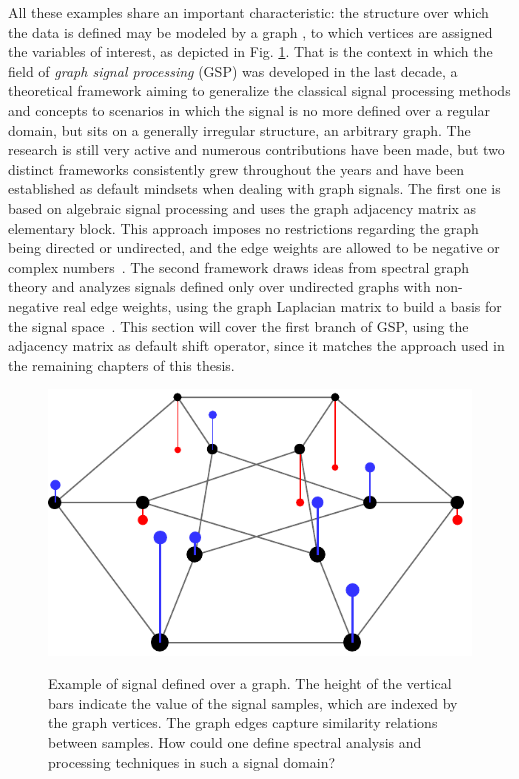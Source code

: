 All these examples share an important characteristic: the structure over which the data is defined may be modeled by a graph \cite{mei2016signal}, to which vertices are assigned the variables of interest, as depicted in Fig. \ref{fig:duher}. That is the context in which the field of \emph{graph signal processing} (GSP) was developed in the last decade, a theoretical framework aiming to generalize the classical signal processing methods and concepts to scenarios in which the signal is no more defined over a regular domain, but sits on a generally irregular structure, an arbitrary graph. The research is still very active and numerous contributions have been made, but two distinct frameworks consistently grew throughout the years and have been established as default mindsets when dealing with graph signals. The first one is based on algebraic signal processing and uses the graph adjacency matrix as elementary block. This approach imposes no restrictions regarding the graph being directed or undirected, and the edge weights are allowed to be negative or complex numbers~\cite{sandryhaila2014big}. The second framework draws ideas from spectral graph theory and analyzes signals defined only over undirected graphs with non-negative real edge weights, using the graph Laplacian matrix to build a basis for the signal space~\cite{shuman2013emerging}. This section will cover the first branch of GSP, using the adjacency matrix as default shift operator, since it matches the approach used in the remaining chapters of this thesis.

\begin{figure}
	\centering
    \caption{Example of signal defined over a graph. The height of the vertical bars indicate the value of the signal samples, which are indexed by the graph vertices. The graph edges capture similarity relations between samples. How could one define spectral analysis and processing techniques in such a signal domain?}
	\includegraphics[width=0.35\linewidth]{Figures/signal_duher_graph_2.pdf}
	\floatsource
	\label{fig:duher}
\end{figure}

